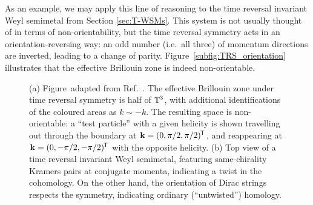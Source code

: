As an example, we may apply this line of reasoning to the time reversal invariant Weyl semimetal from Section \ref{sec:T-WSMs}. This system is not usually thought of in terms of non-orientability, but the time reversal symmetry acts in an orientation-reversing way: an odd number (i.e.\ all three) of momentum directions are inverted, leading to a change of parity. Figure~\ref{subfig:TRS_orientation} illustrates that the effective Brillouin zone is indeed non-orientable.
\begin{figure}[htb!]
	\centering
	\hfil
	\caption{(a) Figure~adapted from Ref.~\cite{Thiang_equivariant}. The effective Brillouin zone under time reversal symmetry is half of $\mathbb{T}^3$, with additional identifications of the coloured areas as $k\sim -k$. The resulting space is non-orientable: a ``test particle'' with a given helicity is shown travelling out through the boundary at $\vb{k} = (0,\pi/2,\pi/2)^{\mkern-1.5mu\mathsf{T}}$, and reappearing at $\vb{k} = (0,-\pi/2,-\pi/2)^{\mkern-1.5mu\mathsf{T}}$ with the opposite helicity. (b) Top view of a time reversal invariant Weyl semimetal, featuring same-chirality Kramers pairs at conjugate momenta, %
		 indicating a twist in the cohomology. On the other hand, the orientation of Dirac strings respects the symmetry, indicating ordinary (``untwisted'') homology.}
	\label{fig:TRS_twist}
\end{figure}
